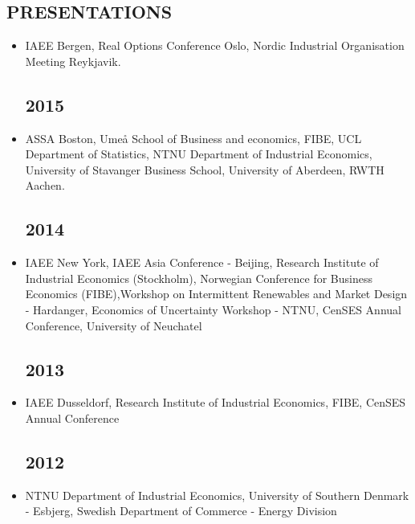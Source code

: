 \documentclass[margin]{res}
\begin{document}
\begin{resume}
\section{PRESENTATIONS}      
 
\begin{itemize}
\normalsize{\section{2016}} 
\item[] IAEE Bergen, Real Options Conference Oslo, Nordic Industrial Organisation Meeting Reykjavik.

\normalsize{\section{2015}} 
\item[] ASSA Boston, Ume\r{a} School of Business and economics, FIBE, UCL Department of Statistics, NTNU Department of Industrial Economics, University of Stavanger Business School, University of Aberdeen, RWTH Aachen.
\normalsize{\section{2014}} 
\item[] IAEE New York, IAEE Asia Conference - Beijing, Research Institute of Industrial Economics (Stockholm), Norwegian Conference for Business Economics (FIBE),Workshop on Intermittent Renewables and Market Design - Hardanger, Economics of Uncertainty Workshop - NTNU, CenSES Annual Conference, University of Neuchatel  
\normalsize{\section{2013}}
\item[] IAEE Dusseldorf, Research Institute of Industrial Economics, FIBE, CenSES Annual Conference 
\normalsize{\section{2012}}
\item[] NTNU Department of Industrial Economics, University of Southern Denmark - Esbjerg, Swedish Department of Commerce - Energy Division
\end{itemize}

 

\end{resume}
\end{document}
